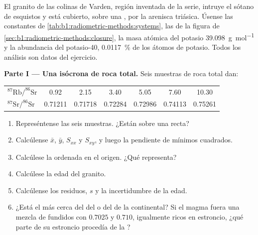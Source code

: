 \begin{problem}
\label{pb:b1:radiometric-methods:1}
El granito de las colinas de Varden, región inventada de la serie, intruye el sótano de esquistos y está cubierto, sobre una , por la arenisca triásica. Úsense las constantes de \cref{tab:b1:radiometric-methods:systems},
las  de la figura de \cref{sec:b1:radiometric-methods:closure}, la masa atómica del potasio \qty{39.098}{g.mol^{-1}} y la abundancia del potasio-40, \qty{0.0117}{\percent} de los átomos de potasio. Todos los análisis son datos del ejercicio.

\medskip
\noindent\textbf{Parte I --- Una isócrona de roca total.} Seis muestras de roca total dan:
\begin{center}
\small
\begin{tabular}{|l|cccccc|}
\hline
$^{87}\mathrm{Rb}/^{86}\mathrm{Sr}$ & 0.92 & 2.15 & 3.40 & 5.05 & 7.60 & 10.30 \\
$^{87}\mathrm{Sr}/^{86}\mathrm{Sr}$ & 0.71211 & 0.71718 & 0.72284 & 0.72986 & 0.74113 & 0.75261 \\
\hline
\end{tabular}
\end{center}
\begin{enumerate}
  \item Represéntense las seis muestras. ¿Están sobre una recta?
  \item Calcúlense $\bar x$, $\bar y$, $S_{xx}$ y $S_{xy}$, y luego la
        pendiente de mínimos cuadrados.
  \item Calcúlese la ordenada en el origen. ¿Qué representa?
  \item Calcúlese la edad del granito.
  \item Calcúlense los residuos, $s$ y la incertidumbre de la edad.
  \item ¿Está el  más cerca del del  o del de la 
        continental? Si el magma fuera una mezcla de fundidos con $0.7025$ y $0.710$,
        igualmente ricos en estroncio, ¿qué parte de su estroncio procedía de la ?
\end{enumerate}


\end{problem}
